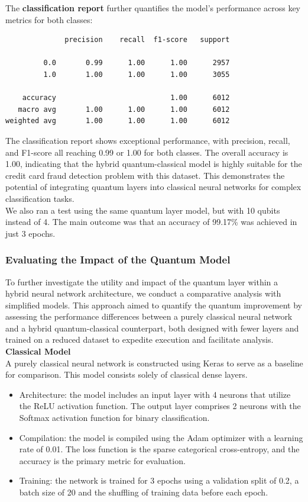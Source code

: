 \documentclass[10pt]{article}
\begin{document}
The \textbf{classification report} further quantifies the model's performance across key metrics for both classes:
\begin{verbatim}
              precision    recall  f1-score   support

         0.0       0.99      1.00      1.00      2957
         1.0       1.00      1.00      1.00      3055

    accuracy                           1.00      6012
   macro avg       1.00      1.00      1.00      6012
weighted avg       1.00      1.00      1.00      6012
\end{verbatim}
The classification report shows exceptional performance, with precision, recall, and F1-score all reaching 0.99 or 1.00 for both classes. The overall accuracy is 1.00, indicating that the hybrid quantum-classical model is highly suitable for the credit card fraud detection problem with this dataset. This demonstrates the potential of integrating quantum layers into classical neural networks for complex classification tasks.\\
We also ran a test using the same quantum layer model, but with 10 qubits instead of 4. The main outcome was that an accuracy of 99.17\% was achieved in just 3 epochs.


\subsubsection{Evaluating the Impact of the Quantum Model}
To further investigate the utility and impact of the quantum layer within a hybrid neural network architecture, we conduct a comparative analysis with simplified models. This approach aimed to quantify the quantum improvement by assessing the performance differences between a purely classical neural network and a hybrid quantum-classical counterpart, both designed with fewer layers and trained on a reduced dataset to expedite execution and facilitate analysis.\\

\noindent \textbf{Classical Model} \\
A purely classical neural network is constructed using Keras to serve as a baseline for comparison. This model consists solely of classical dense layers.
\begin{itemize}
    \item Architecture: the model includes an input layer with 4 neurons that utilize the ReLU activation function. The output layer comprises 2 neurons with the Softmax activation function for binary classification.
    \item Compilation: the model is compiled using the Adam optimizer with a learning rate of 0.01. The loss function is the sparse categorical cross-entropy, and the accuracy is the primary metric for evaluation.
    \item Training: the network is trained for 3 epochs using a validation split of 0.2, a batch size of 20 and the shuffling of training data before each epoch.
\end{itemize}
\end{document}
